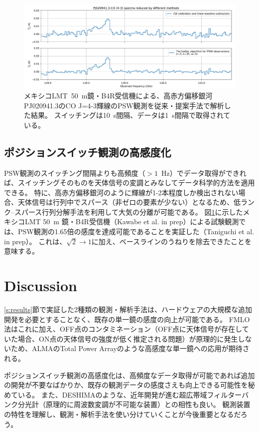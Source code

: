 \documentclass[a4paper,10pt,oneside,twocolumn,notitlepage,final]{jarticle}
\begin{document}
\begin{figure}[t]
    \centering
    \includegraphics[width=\textwidth]{figures/figure-3}
    \caption{
        メキシコLMT~50~m鏡・B4R受信機による、高赤方偏移銀河PJ020941.3のCO J=4-3輝線のPSW観測を従来・提案手法で解析した結果。
        スイッチングは10~s間隔、データは1~s間隔で取得されている。
    }
    \label{fig:3}
\end{figure}

\subsection{ポジションスイッチ観測の高感度化}

PSW観測のスイッチング間隔よりも高頻度（$>1$~Hz）でデータ取得ができれば、スイッチングそのものを天体信号の変調とみなしてデータ科学的方法を適用できる。
特に、高赤方偏移銀河のように輝線が1-2本程度しか検出されない場合、天体信号は行列中でスパース（非ゼロの要素が少ない）となるため、低ランク--スパース行列分解手法\citep{Thou+11}を利用して大気の分離が可能である。
図\ref{fig:3}に示したメキシコLMT 50~m 鏡・B4R受信機（Kawabe et al. in prep）による試験観測では、PSW観測の1.65倍の感度を達成可能であることを実証した（Taniguchi et al. in prep）。
これは、$\sqrt{2}\rightarrow1$に加え、ベースラインのうねりを除去できたことを意味する。

\section{Discussion}
\label{s:discussion}

\ref{s:results}節で実証した2種類の観測・解析手法は、ハードウェアの大規模な追加開発を必要とすることなく、既存の単一鏡の感度の向上が可能である。
FMLO法はこれに加え、OFF点のコンタミネーション（OFF点に天体信号が存在していた場合、ON点の天体信号の強度が低く推定される問題）が原理的に発生しないため、ALMAのTotal Power Arrayのような高感度な単一鏡への応用が期待される。

ポジションスイッチ観測の高感度化は、高頻度なデータ取得が可能であれば追加の開発が不要なばかりか、既存の観測データの感度さえも向上できる可能性を秘めている。
また、DESHIMA\citep{Endo+19b}のような、近年開発が進む超広帯域フィルターバンク分光計（原理的に周波数変調が不可能な装置）との相性も良い。
観測装置の特性を理解し、観測・解析手法を使い分けていくことが今後重要となるだろう。
\end{document}
